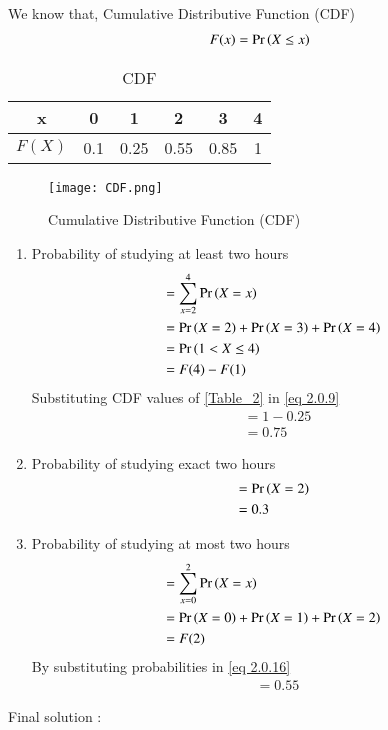 \documentclass[journal,12pt,twocolumn]{IEEEtran}
\begin{document}
We know that, Cumulative Distributive Function (CDF) 
\begin{align}
    F(x) = \Pr\left(X \le x\right)
\end{align}
\begin{table}[ht]
  
  \centering
  \begin{tabular}{|c|c|c|c|c|c|}
    \hline
    x &  0 & 1 & 2 & 3 & 4\\
    \hline
    $F(X)$ & 0.1& 0.25& 0.55 & 0.85 & 1\\
    \hline
    
\end{tabular} 
\caption{CDF}
\label{Table_2}
\end{table}

\begin{figure}[ht]
    \centering
    \texttt{[image: CDF.png]}
    \caption{Cumulative Distributive Function (CDF) }
    \label{Figure_2}
\end{figure}

\vspace{3mm}
    \begin{enumerate}
        \item Probability of studying at least two hours 
        \begin{align}
            & = \sum_{x = 2}^4 \Pr\left(X = x\right)\\
            & = \Pr\left(X = 2\right) +\Pr\left(X = 3\right) + \Pr\left(X = 4\right) \\
            & = \Pr\left(1 < X \le 4\right)\\ 
            & =  F(4) - F(1)\label{eq 2.0.9}
        \end{align}
        Substituting CDF values of \eqref{Table_2} in \eqref{eq 2.0.9}
        \begin{align}
            &  = 1 - 0.25\\
            & = 0.75
        \end{align}
        
        \item Probability of studying exact two hours
        \begin{align}
            & = \Pr\left(X = 2\right)\\
            & = 0.3
        \end{align}
        
        \item Probability of studying at most two hours 
        \begin{align}
          & = \sum_{x = 0}^2  \Pr\left(X = x\right)\\
          & = \Pr\left(X = 0\right) + \Pr\left(X = 1\right) + \Pr\left(X = 2\right)\\
           & = F(2)\label{eq 2.0.16}
        \end{align}
        By substituting probabilities in \eqref{eq 2.0.16}
        \begin{align}
            & = 0.55
        \end{align}
    \end{enumerate}
  Final solution :  
  
\end{document}
